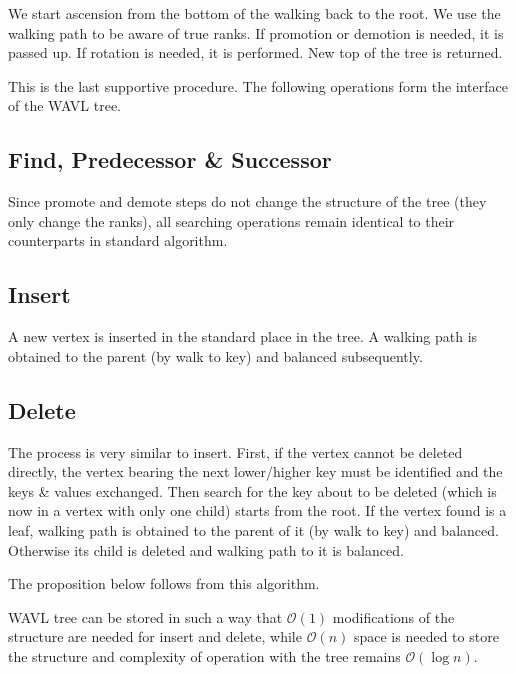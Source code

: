 We start ascension from the bottom of the walking back to the root. We use the walking path to be aware of true ranks. If promotion or demotion is needed, it is passed up. If rotation is needed, it is performed. New top of the tree is returned. 

This is the last supportive procedure. The following operations form the interface of the WAVL tree.

\subsection{Find, Predecessor \& Successor}

Since promote and demote steps do not change the structure of the tree (they only change the ranks), all searching operations remain identical to their counterparts in standard algorithm.

\subsection{Insert}

A new vertex is inserted in the standard place in the tree. A walking path is obtained to the parent (by walk to key) and balanced subsequently.

\subsection{Delete}

The process is very similar to insert. First, if the vertex cannot be deleted directly, the vertex bearing the next lower/higher key must be identified and the keys \& values exchanged. Then search for the key about to be deleted (which is now in a vertex with only one child) starts from the root. If the vertex found is a leaf, walking path is obtained to the parent of it (by walk to key) and balanced. Otherwise its child is deleted and walking path to it is balanced.

The proposition below follows from this algorithm.

\begin{prop}
WAVL tree can be stored in such a way that $\mathcal{O}(1)$ modifications of the structure are needed for insert and delete, while $\mathcal{O}(n)$ space is needed to store the structure and complexity of operation with the tree remains $\mathcal{O}(\log n)$.
\end{prop}

